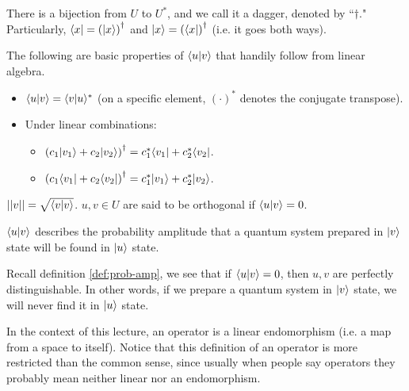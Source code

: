 \documentclass[12pt]{article}
\begin{document}
\begin{definition}
There is a bijection from $U$ to $U^*$, and we call it a dagger, denoted by ``$\dag$." Particularly, $\langle x| = \prt{|x\rangle}^\dag$ and $|x\rangle = \prt{\langle x|}^\dag$ (i.e. it goes both ways).
\end{definition}

\begin{proposition}
The following are basic properties of $\bk{u}{v}$ that handily follow from linear algebra.
\begin{itemize}
    \item $\bk{u}{v} = \bk{v}{u}^*$ (on a specific element, $(\cdot)^*$ denotes the conjugate transpose).
    \item Under linear combinations:
    \begin{itemize}
        \item $\prt{c_1\Ket{v_1}+c_2\Ket{v_2}}^\dag = c_1^* \Bra{v_1} + c_2^*\Bra{v_2}$.
        \item $\prt{c_1\Bra{v_1}+c_2\Bra{v_2}}^\dag = c_1^* \Ket{v_1} + c_2^*\Ket{v_2}$.
    \end{itemize}
\end{itemize}
\end{proposition}

\begin{definition}
$||v|| = \sqrt{\bk{v}{v}}$. $u,v\in U$ are said to be orthogonal if $\bk{u}{v} = 0$.
\end{definition}

\begin{definition}\label{def:prob-amp}
$\bk{u}{v}$ describes the probability amplitude that a quantum system prepared in $\Ket{v}$ state will be found in $\Ket{u}$ state.
\end{definition}

\begin{definition}\label{def:perf-dist}
Recall definition \ref{def:prob-amp}, we see that if $\bk{u}{v} = 0$, then $u,v$ are perfectly distinguishable. In other words, if we prepare a quantum system in $\Ket{v}$ state, we will never find it in $\Ket{u}$ state.
\end{definition}

\begin{definition}[Operators]
In the context of this lecture, an operator is a linear endomorphism (i.e. a map from a space to itself). Notice that this definition of an operator is more restricted than the common sense, since usually when people say operators they probably mean neither linear nor an endomorphism.
\end{definition}
\end{document}
